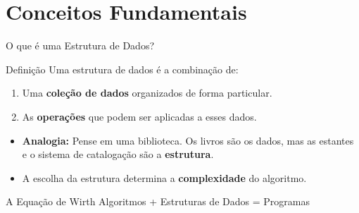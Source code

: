\documentclass[aspectratio=169]{beamer}
\begin{document}
\section{Conceitos Fundamentais}

\begin{frame}{O que é uma Estrutura de Dados?}
    \begin{block}{Definição}
        Uma estrutura de dados é a combinação de:
        \begin{enumerate}
            \item Uma \textbf{coleção de dados} organizados de forma particular.
            \item As \textbf{operações} que podem ser aplicadas a esses dados.
        \end{enumerate}
    \end{block}
    \vspace{0.3cm}
    \begin{itemize}
        \item \textbf{Analogia:} Pense em uma biblioteca. Os livros são os dados, mas as estantes e o sistema de catalogação são a \textbf{estrutura}.
        \item A escolha da estrutura determina a \textbf{complexidade} do algoritmo.
    \end{itemize}
    \vspace{0.3cm}
    \begin{block}{A Equação de Wirth}
        \centering
        Algoritmos + Estruturas de Dados = Programas
    \end{block}
\end{frame}
\end{document}
